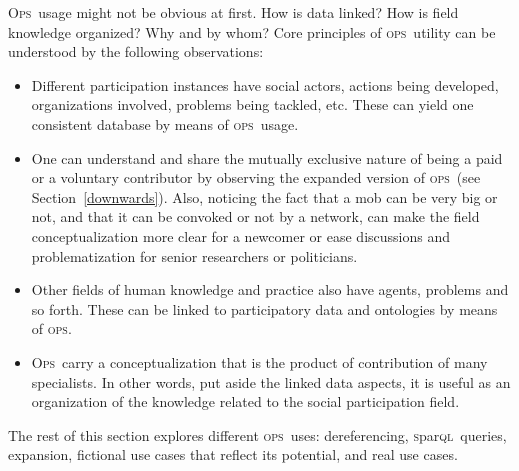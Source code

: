 \documentclass[10pt,letterpaper]{article}
\newcommand{\ops}{\textsc{ops}}
\newcommand{\opsi}{O\textsc{ps}}
\newcommand{\sparql}{\textsc{s}par\textsc{ql}}
\begin{document}
\opsi\ usage might not be obvious at first.
How is data linked? How is field knowledge organized? Why and by whom?
Core principles of \ops\ utility can be understood by the following observations:
\begin{itemize}
    \item Different participation instances have social actors,
    actions being developed, organizations involved, problems being tackled, etc.
    These can yield one consistent database by means of \ops\ usage.
    \item One can understand and share the mutually exclusive nature of being
    a paid or a voluntary contributor by observing the expanded version of \ops\ (see Section~\ref{downwards}).
    Also, noticing the fact that a mob can be very big or not,
    and that it can be convoked or not by a network,
    can make the field conceptualization more clear for a newcomer
    or ease discussions and problematization for senior researchers or politicians.
    \item Other fields of human knowledge and practice also have agents, problems and so forth.
    These can be linked to participatory data and ontologies by means of \ops.
    \item \opsi\ carry a conceptualization that is the product of contribution of many specialists.
    In other words, put aside the linked data aspects,
    it is useful as an organization of the knowledge related to the social participation field.
\end{itemize}

The rest of this section explores different \ops\ uses:
dereferencing, \sparql\ queries, expansion, fictional use cases that reflect its potential,
and real use cases.
\end{document}
